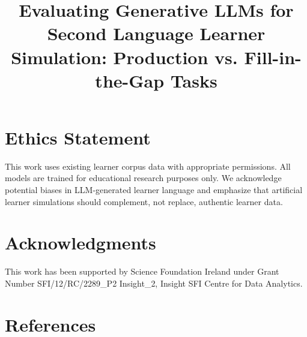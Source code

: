 \documentclass[10pt, a4paper]{article}
\title{Evaluating Generative LLMs for Second Language Learner Simulation: Production vs. Fill-in-the-Gap Tasks}
\begin{document}
\maketitleabstract













\section*{Ethics Statement}
This work uses existing learner corpus data with appropriate permissions. All models are trained for educational research purposes only. We acknowledge potential biases in LLM-generated learner language and emphasize that artificial learner simulations should complement, not replace, authentic learner data.

\section*{Acknowledgments}
This work has been supported by Science Foundation Ireland under Grant Number SFI/12/RC/2289\_P2 Insight\_2, Insight SFI Centre for Data Analytics.

\section{References}


\end{document}
